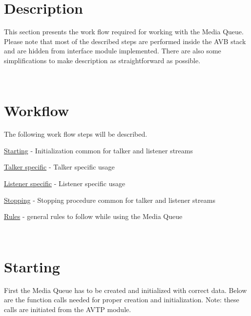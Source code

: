 \section*{Description}

This section presents the work flow required for working with the Media Queue. Please note that most of the described steps are performed inside the A\+VB stack and are hidden from interface module implemented. There are also some simplifications to make description as straightforward as possible.

~\newline


\section*{Workflow}

The following work flow steps will be described.
\begin{DoxyItemize}
\item \hyperlink{sdk_notes_media_queue_usage_media_queue_usage_start}{Starting} -\/ Initialization common for talker and listener streams
\item \hyperlink{sdk_notes_media_queue_usage_media_queue_usage_talker}{Talker specific} -\/ Talker specific usage
\item \hyperlink{sdk_notes_media_queue_usage_media_queue_usage_listener}{Listener specific} -\/ Listener specific usage
\item \hyperlink{sdk_notes_media_queue_usage_media_queue_usage_stop}{Stopping} -\/ Stopping procedure common for talker and listener streams
\item \hyperlink{sdk_notes_media_queue_usage_media_queue_usage_rules}{Rules} -\/ general rules to follow while using the Media Queue
\end{DoxyItemize}

~\newline
\hypertarget{sdk_notes_media_queue_usage_media_queue_usage_start}{}\section{Starting }\label{sdk_notes_media_queue_usage_media_queue_usage_start}
First the Media Queue has to be created and initialized with correct data. Below are the function calls needed for proper creation and initialization. Note\+: these calls are initiated from the A\+V\+TP module.


